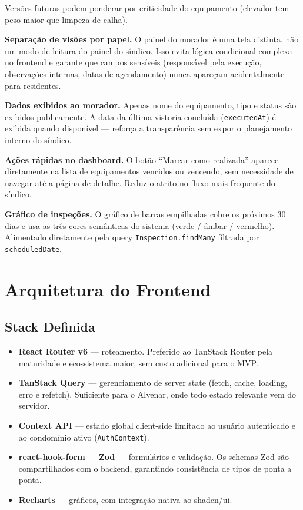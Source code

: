 \documentclass[12pt, a4paper]{article}
\begin{document}
Versões futuras podem ponderar por criticidade do equipamento (elevador
tem peso maior que limpeza de calha).

\textbf{Separação de visões por papel.}
O painel do morador é uma tela distinta, não um modo de leitura do painel do
síndico. Isso evita lógica condicional complexa no frontend e garante que campos
sensíveis (responsável pela execução, observações internas, datas de agendamento)
nunca apareçam acidentalmente para residentes.

\textbf{Dados exibidos ao morador.}
Apenas nome do equipamento, tipo e status são exibidos publicamente. A data da
última vistoria concluída (\texttt{executedAt}) é exibida quando disponível —
reforça a transparência sem expor o planejamento interno do síndico.

\textbf{Ações rápidas no dashboard.}
O botão ``Marcar como realizada'' aparece diretamente na lista de equipamentos
vencidos ou vencendo, sem necessidade de navegar até a página de detalhe.
Reduz o atrito no fluxo mais frequente do síndico.

\textbf{Gráfico de inspeções.}
O gráfico de barras empilhadas cobre os próximos 30 dias e usa as três cores
semânticas do sistema (verde / âmbar / vermelho). Alimentado diretamente pela
query \texttt{Inspection.findMany} filtrada por \texttt{scheduledDate}.


\vspace{0.5cm}

\section{Arquitetura do Frontend}
\label{sec:frontarq}

\subsection{Stack Definida}

\begin{itemize}[leftmargin=1.5em]
    \item \textbf{React Router v6} --- roteamento. Preferido ao TanStack Router
    pela maturidade e ecossistema maior, sem custo adicional para o MVP.
    \item \textbf{TanStack Query} --- gerenciamento de server state (fetch, cache,
    loading, erro e refetch). Suficiente para o Alvenar, onde todo estado relevante
    vem do servidor.
    \item \textbf{Context API} --- estado global client-side limitado ao usuário
    autenticado e ao condomínio ativo (\texttt{AuthContext}).
    \item \textbf{react-hook-form + Zod} --- formulários e validação. Os schemas Zod
    são compartilhados com o backend, garantindo consistência de tipos de ponta a ponta.
    \item \textbf{Recharts} --- gráficos, com integração nativa ao shadcn/ui.
\end{itemize}
\end{document}

